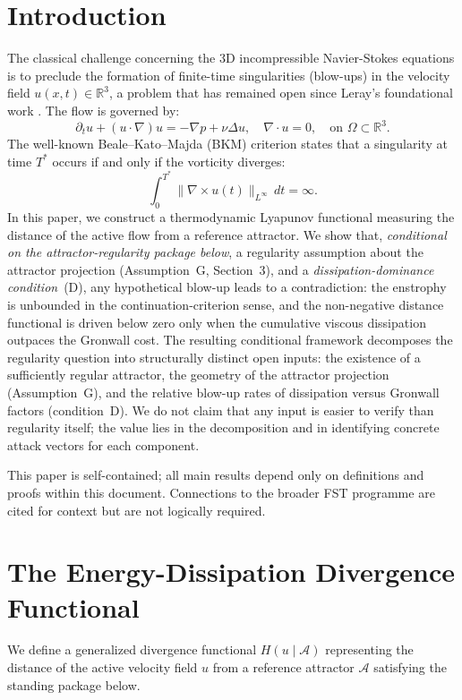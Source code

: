 \documentclass[12pt,a4paper]{article}
\theoremstyle{definition}
\theoremstyle{plain}
\theoremstyle{remark}
\begin{document}
\clearpage
\tableofcontents
\clearpage

\section{Introduction}
The classical challenge concerning the 3D incompressible Navier-Stokes equations is to preclude the formation of finite-time singularities (blow-ups) in the velocity field $u(x,t) \in \mathbb{R}^3$, a problem that has remained open since Leray's foundational work \cite{Leray1934}. The flow is governed by:
\begin{equation}
    \partial_t u + (u \cdot \nabla) u = -\nabla p + \nu \Delta u, \quad \nabla \cdot u = 0, \quad \text{on } \Omega \subset \mathbb{R}^3.
\end{equation}
The well-known Beale--Kato--Majda (BKM) criterion \cite{BealeKatoMajda1984} states that a singularity at time $T^*$ occurs if and only if the vorticity diverges:
\begin{equation}
    \int_0^{T^*} \|\nabla \times u(t)\|_{L^\infty} \, dt = \infty.
\end{equation}
In this paper, we construct a thermodynamic Lyapunov functional measuring the distance of the active flow from a reference attractor. We show that, \emph{conditional on the attractor-regularity package below}, a regularity assumption about the attractor projection (Assumption~G, Section~3), and a \emph{dissipation-dominance condition}~(D), any hypothetical blow-up leads to a contradiction: the enstrophy is unbounded in the continuation-criterion sense, and the non-negative distance functional is driven below zero only when the cumulative viscous dissipation outpaces the Gronwall cost. The resulting conditional framework decomposes the regularity question into structurally distinct open inputs: the existence of a sufficiently regular attractor, the geometry of the attractor projection (Assumption~G), and the relative blow-up rates of dissipation versus Gronwall factors (condition~D). We do not claim that any input is easier to verify than regularity itself; the value lies in the decomposition and in identifying concrete attack vectors for each component.

This paper is self-contained; all main results depend only on definitions and proofs within this document. Connections to the broader FST programme are cited for context but are not logically required.

\section{The Energy-Dissipation Divergence Functional}
We define a generalized divergence functional $H(u \mid \mathcal{A})$ representing the distance of the active velocity field $u$ from a reference attractor $\mathcal{A}$ satisfying the standing package below.
\end{document}
